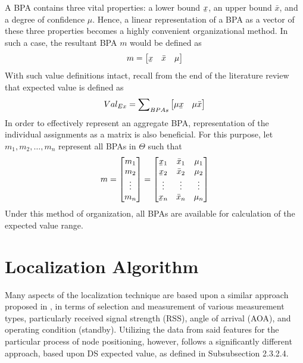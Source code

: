 \documentclass[12pt]{uthesis-v12}  %
\newcommand{\ubar}[1]{\underaccent{\bar}{#1}}
\begin{document}
A BPA contains three vital properties: a lower bound $\ubar{x}$, an upper bound $\bar{x}$, and a degree of confidence $\mu$. Hence, a linear representation of a BPA as a vector of these three properties becomes a highly convenient organizational method. In such a case, the resultant BPA $m$ would be defined as 
\begin{equation}
m = \begin{bmatrix*}
\ubar{x} & \bar{x} & \mu \end{bmatrix*}
\label{bpam}
\end{equation}
With such value definitions intact, recall from the end of the literature review that expected value is defined as
\begin{equation}
Val_{Ex} = \sum\nolimits_{BPAs} 
\begin{bmatrix*} \mu \ubar{x} & \mu \bar{x} \end{bmatrix*}
\label{expval}
\end{equation}
In order to effectively represent an aggregate BPA, representation of the individual assignments as a matrix is also beneficial. For this purpose, let $m_1, m_2,\dots,m_n$ represent all BPAs in $\Theta$ such that
\begin{equation}
m = \begin{bmatrix*}
m_1 \\
m_2 \\
\vdots \\
m_n \end{bmatrix*}
= \begin{bmatrix*}
\ubar{x}_1 & \bar{x}_1 & \mu_1 \\
\ubar{x}_2 & \bar{x}_2 & \mu_2 \\
\vdots & \vdots & \vdots \\
\ubar{x}_n & \bar{x}_n & \mu_n \\ \end{bmatrix*}
\label{m}
\end{equation}
Under this method of organization, all BPAs are available for calculation of the expected value range.

\section{Localization Algorithm}

Many aspects of the localization technique are based upon a similar approach proposed in \cite{kumarasiri2}, in terms of selection and measurement of various measurement types, particularly received signal strength (RSS), angle of arrival (AOA), and operating condition (standby). Utilizing the data from said features for the particular process of node positioning, however, follows a significantly different approach, based upon DS expected value, as defined in Subsubsection 2.3.2.4.
\end{document}

